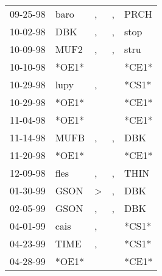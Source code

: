 \begin{supertabular}{p{0.07\textwidth}p{0.06\textwidth}p{0.02\textwidth}p{0.02\textwidth}p{0.06\textwidth}}
 09-25-98\textsuperscript{} &          baro\textsuperscript{} &                , &             , &           PRCH\textsuperscript{} \\
 10-02-98\textsuperscript{} &           DBK\textsuperscript{} &                , &             , &           stop\textsuperscript{} \\
 10-09-98\textsuperscript{} &          MUF2\textsuperscript{} &                , &             , &           stru\textsuperscript{} \\
 10-10-98\textsuperscript{} &                           *OE1* &                  &               &                            *CE1* \\
 10-29-98\textsuperscript{} &          lupy\textsuperscript{} &                , &               &                            *CS1* \\
 10-29-98\textsuperscript{} &                           *OE1* &                  &               &                            *CE1* \\
 11-04-98\textsuperscript{} &                           *OE1* &                  &               &                            *CE1* \\
 11-14-98\textsuperscript{} &          MUFB\textsuperscript{} &                , &             , &            DBK\textsuperscript{} \\
 11-20-98\textsuperscript{} &                           *OE1* &                  &               &                            *CE1* \\
 12-09-98\textsuperscript{} &          fles\textsuperscript{} &                , &             , &           THIN\textsuperscript{} \\
 01-30-99\textsuperscript{} &          GSON\textsuperscript{} &     \textgreater &             , &            DBK\textsuperscript{} \\
 02-05-99\textsuperscript{} &          GSON\textsuperscript{} &                , &             , &            DBK\textsuperscript{} \\
 04-01-99\textsuperscript{} &          cais\textsuperscript{} &                , &               &                            *CS1* \\
 04-23-99\textsuperscript{} &          TIME\textsuperscript{} &                , &               &                            *CS1* \\
 04-28-99\textsuperscript{} &                           *OE1* &                  &               &                            *CE1* \\

\end{supertabular}
